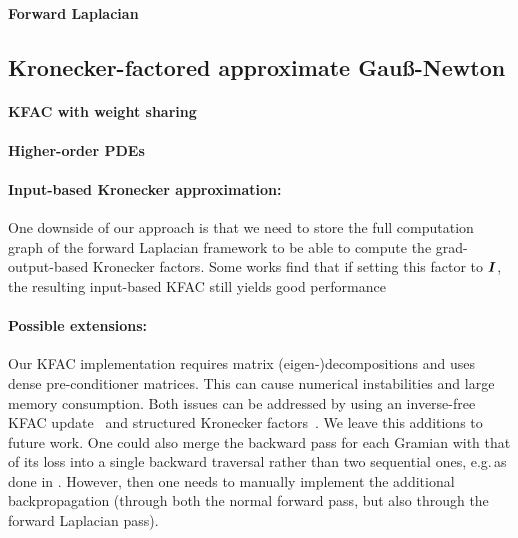 \paragraph{Forward Laplacian}


\subsection{Kronecker-factored approximate Gauß-Newton}

\paragraph{KFAC with weight sharing}

\paragraph{Higher-order PDEs}

\paragraph{Input-based Kronecker approximation:} One downside of our approach is that we need to store the full computation graph of the forward Laplacian framework to be able to compute the grad-output-based Kronecker factors.
Some works find that if setting this factor to ${\bm{I}}$, the resulting input-based KFAC still yields good performance~\cite{benzing2022gradient,petersen2023isaac}

\paragraph{Possible extensions:} Our KFAC implementation requires matrix (eigen-)decompositions and uses dense pre-conditioner matrices.
This can cause numerical instabilities and large memory consumption.
Both issues can be addressed by using an inverse-free KFAC update~\cite{lin2023simplifying} and structured Kronecker factors~\cite{lin2023structured}.
We leave this additions to future work.
One could also merge the backward pass for each Gramian with that of its loss into a single backward traversal rather than two sequential ones, e.g.\,as done in \cite{dangel2020backpack}.
However, then one needs to manually implement the additional backpropagation (through both the normal forward pass, but also through the forward Laplacian pass).

